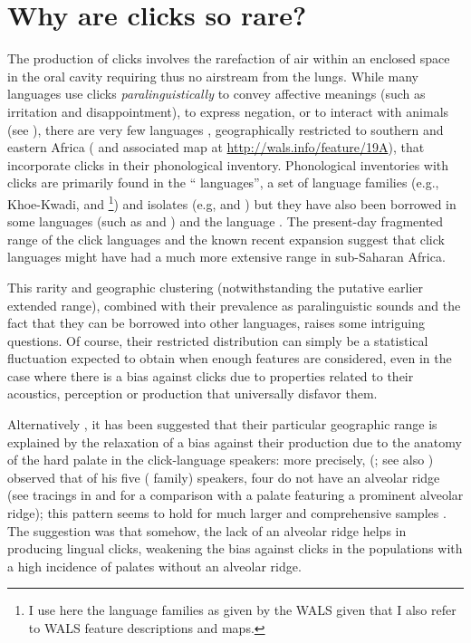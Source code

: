 \documentclass[output=paper]{langsci/langscibook}
\begin{document}
\section{Why are clicks so rare?}
  
The production of clicks involves the rarefaction of air within an enclosed space in the oral cavity requiring thus no airstream from the lungs. While many languages use clicks \textit{paralinguistically} to convey affective meanings (such as irritation and disappointment), to express negation, or to interact with animals (see \citealt{Gil2013}), there are very few languages \citep[10 as counted by][]{Maddieson2013a}, geographically restricted to southern and eastern Africa (\citealt{Maddieson2013a} and associated map at \url{http://wals.info/feature/19A}), that incorporate clicks in their phonological inventory. Phonological inventories with clicks are primarily found in the “ languages”, a set of language families (e.g., Khoe-Kwadi,  and \footnote{I use here the language families as given by the WALS \citep{DryerEtAl2013} given that I also refer to WALS feature descriptions and maps.}) and isolates (e.g,  and ) but they have also been borrowed in some  languages (such as  and ) and the  language . The present-day fragmented range of the click languages and the known recent  expansion suggest that click languages might have had a much more extensive range in sub-Saharan Africa. 

This rarity and geographic clustering (notwithstanding the putative earlier extended range), combined with their prevalence as paralinguistic sounds and the fact that they can be borrowed  into other languages, raises some intriguing questions. Of course, their restricted distribution can simply be a statistical fluctuation expected to obtain when enough features are considered, even in the case where there is a bias against clicks due to properties related to their acoustics, perception or production that universally disfavor them.    

Alternatively \citep{MoisikEtAl2015}, it has been suggested that their particular geographic range is explained by the relaxation of a bias against their production due to the anatomy of the hard palate in the click-language speakers: more precisely, \citeauthor{Traill1985} (\citeyear{Traill1985}; see also \citealt{Traunmüller2003}) observed that of his five  ( family) speakers, four do not have an alveolar ridge (see tracings in \citealt{Traill1985} and \citealt{MoisikEtAl2015} for a comparison with a palate featuring a prominent alveolar ridge); this pattern seems to hold for much larger and comprehensive samples \citep[reviewed in][]{MoisikEtAl2015}. The suggestion was that somehow, the lack of an alveolar ridge helps in producing lingual clicks, weakening the bias against clicks in the populations with a high incidence of palates without an alveolar ridge. 
\end{document}
